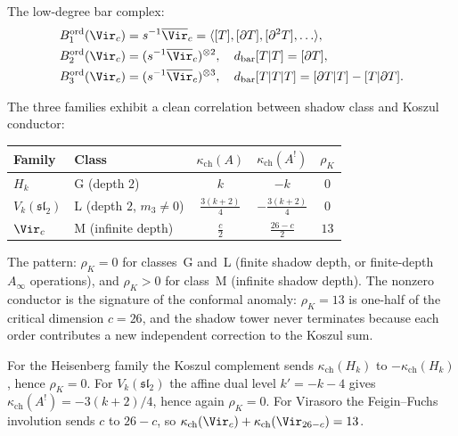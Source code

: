 The low-degree bar complex:
\begin{align}
 B^{\mathrm{ord}}_1(\Vir_c) &= s^{-1}\overline{\Vir}_c =
 \langle [T], [\partial T], [\partial^2 T], \ldots \rangle,
 \label{eq:vir-bar-1} \\
 B^{\mathrm{ord}}_2(\Vir_c) &= (s^{-1}\overline{\Vir}_c)^{\otimes 2},
 \quad d_{\mathrm{bar}}[T|T] = [\partial T],
 \label{eq:vir-bar-2} \\
 B^{\mathrm{ord}}_3(\Vir_c) &= (s^{-1}\overline{\Vir}_c)^{\otimes 3},
 \quad d_{\mathrm{bar}}[T|T|T] = [\partial T|T] - [T|\partial T].
 \label{eq:vir-bar-3}
\end{align}

\begin{remark}
\label{rem:conductor-glm}
The three families exhibit a clean correlation between shadow class and
Koszul conductor:
\begin{center}
\renewcommand{\arraystretch}{1.3}
\begin{tabular}{llccc}
\toprule
\textbf{Family} & \textbf{Class} & $\kappa_{\mathrm{ch}}(A)$ &
$\kappa_{\mathrm{ch}}(A^!)$ & $\rho_K$ \\
\midrule
$H_k$ & G (depth $2$) & $k$ & $-k$ & $0$ \\
$V_k(\mathfrak{sl}_2)$ & L (depth $2$, $m_3 \neq 0$) &
$\frac{3(k+2)}{4}$ & $-\frac{3(k+2)}{4}$ & $0$ \\
$\Vir_c$ & M (infinite depth) & $\frac{c}{2}$ &
$\frac{26-c}{2}$ & $13$ \\
\bottomrule
\end{tabular}
\end{center}
The pattern: $\rho_K = 0$ for classes~G and~L (finite shadow depth, or
finite-depth $A_\infty$ operations), and $\rho_K > 0$ for class~M
(infinite shadow depth). The nonzero conductor is the signature of the
conformal anomaly: $\rho_K = 13$ is one-half of the critical dimension
$c = 26$, and the shadow tower never terminates because each order
contributes a new independent correction to the Koszul sum.
\end{remark}

\begin{remark}
\label{rem:koszul-three-families-verification}
For the Heisenberg family the Koszul complement sends
$\kappa_{\mathrm{ch}}(H_k)$ to $-\kappa_{\mathrm{ch}}(H_k)$, hence
$\rho_K = 0$.  For $V_k(\mathfrak{sl}_2)$ the affine dual level
$k' = -k - 4$ gives
$\kappa_{\mathrm{ch}}(A^!) = -3(k+2)/4$, hence again $\rho_K = 0$.
For Virasoro the Feigin--Fuchs involution sends $c$ to $26-c$, so
$\kappa_{\mathrm{ch}}(\Vir_c) + \kappa_{\mathrm{ch}}(\Vir_{26-c}) = 13$.
\end{remark}

